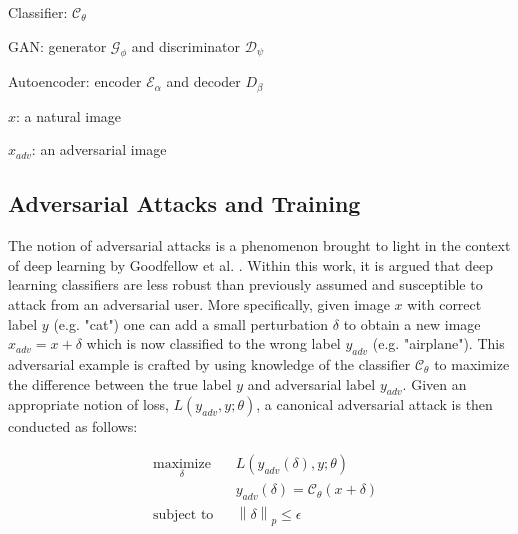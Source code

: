 \documentclass{article}
\theoremstyle{definition}
\newcommand{\norm}[2]{\left\lVert #1 \right\rVert_{#2}}
\begin{document}
Classifier: $\mathcal{C}_{\theta}$

GAN: generator $\mathcal{G}_{\phi}$ and discriminator $\mathcal{D}_{\psi}$

Autoencoder: encoder $\mathcal{E}_{\alpha}$ and decoder $D_\beta$

$x$: a natural image

$x_{adv}$: an adversarial image

\subsection{Adversarial Attacks and Training}
The notion of adversarial attacks is a phenomenon brought to light in the context of deep learning by Goodfellow et al. \cite{2014arXiv1412.6572G}. Within this work, it is argued that deep learning classifiers are less robust than previously assumed and susceptible to attack from an adversarial user. More specifically, given image $x$ with correct label $y$ (e.g. "cat") one can add a small perturbation $\delta$ to obtain a new image $x_{adv} = x + \delta$ which is now classified to the wrong label $y_{adv}$ (e.g. "airplane"). This adversarial example is crafted by using knowledge of the classifier $\mathcal{C_{\theta}}$ to maximize the difference between the true label $y$ and adversarial label $y_{adv}$. Given an appropriate notion of loss, $L(y_{adv},y;\theta)$, a canonical adversarial attack is then conducted as follows:

\begin{problem}
    \begin{equation*}
    \begin{aligned}
    & \underset{\delta}{\text{maximize}}
    & & L(y_{adv}(\delta),y;\theta) \\
    &
    & & y_{adv}(\delta) = \mathcal{C}_{\theta}(x + \delta) \\
    & \text{subject to}
    & & \norm{\delta}{p} \leq \epsilon
    \end{aligned}
    \end{equation*}
\end{problem}
\end{document}
